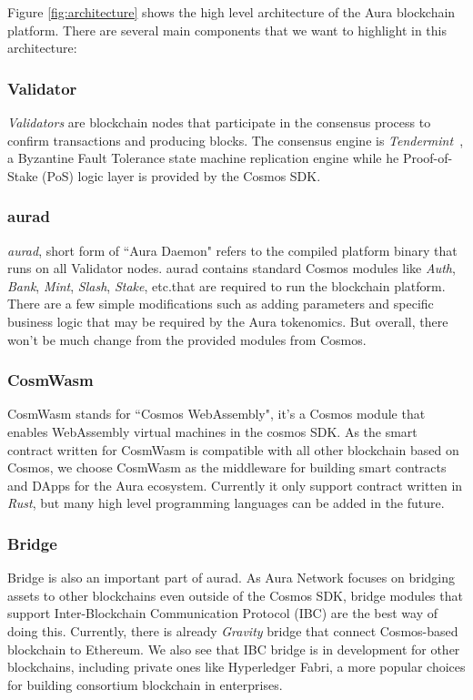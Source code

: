 \documentclass[12pt]{article}
\begin{document}
Figure \ref{fig:architecture} shows the high level architecture of the Aura blockchain platform. There are several main components that we want to highlight in this architecture:

\subsubsection*{Validator}
\emph{Validators} are blockchain nodes that participate in the consensus process to confirm transactions and producing blocks.
The consensus engine is \emph{Tendermint}~\cite{buchman2016tendermint}, a Byzantine Fault Tolerance state machine replication engine while he Proof-of-Stake (PoS) logic layer is provided by the Cosmos SDK. 

\subsubsection*{aurad}
\emph{aurad}, short form of ``Aura Daemon" refers to the compiled platform binary that runs on all Validator nodes. aurad contains standard Cosmos modules like \emph{Auth}, \emph{Bank}, \emph{Mint}, \emph{Slash}, \emph{Stake}, etc.that are required to run the blockchain platform. There are a few simple modifications such as adding parameters and specific business logic that may be required by the Aura tokenomics. But overall, there won't be much change from the provided modules from Cosmos.

\subsubsection*{CosmWasm}
CosmWasm stands for ``Cosmos WebAssembly", it's a Cosmos module that enables WebAssembly virtual machines in the cosmos SDK. As the smart contract written for CosmWasm is compatible with all other blockchain based on Cosmos, we choose CosmWasm as the middleware for building smart contracts and DApps for the Aura ecosystem. Currently it only support contract written in \emph{Rust}, but many high level programming languages can be added in the future.

\subsubsection*{Bridge}
Bridge is also an important part of aurad. As Aura Network focuses on bridging assets to other blockchains even outside of the Cosmos SDK, bridge modules that support  Inter-Blockchain Communication Protocol (IBC) are the best way of doing this. Currently, there is already \emph{Gravity} bridge that connect Cosmos-based blockchain to Ethereum. We also see that IBC bridge is in development for other blockchains, including private ones like Hyperledger Fabri, a more popular choices for building consortium blockchain in enterprises. 
\end{document}
